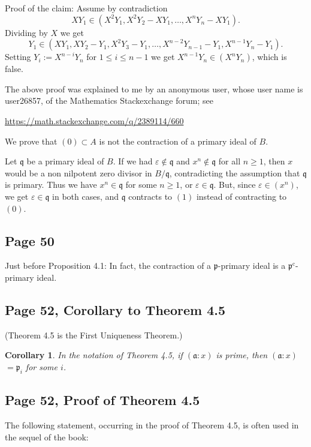\documentclass[parskip=half,fontsize=12pt]{scrartcl}%
\newcommand{\oo}{\operatorname}\newcommand{\ooo}{\operatorname*}
\newcommand{\mf}{\mathfrak}
\newcommand{\aaa}{\mf a}
\newcommand{\ppp}{\mf p}
\newtheorem{cor}[thm]{Corollary}
\begin{document}
Proof of the claim: Assume by contradiction 
$$
XY_1\in(X^2Y_1,X^2Y_2-XY_1,\dots,X^nY_n-XY_1).
$$ 
Dividing by $X$ we get 
$$
Y_1\in(XY_1,XY_2-Y_1,X^2Y_3-Y_1,\dots,X^{n-2}Y_{n-1}-Y_1,X^{n-1}Y_n-Y_1).
$$ 
Setting $Y_i:=X^{n-i}Y_n$ for $1\le i\le n-1$ we get $X^{n-1}Y_n\in(X^nY_n)$, which is false. 

The above proof was explained to me by an anonymous user, whose user name is user26857, of the Mathematics Stackexchange forum; see 

\href{https://math.stackexchange.com/q/2389114/660}{https://math.stackexchange.com/q/2389114/660}

We prove that $(0)\subset A$ is not the contraction of a primary ideal of $B$.

Let $\mathfrak q$ be a primary ideal of $B$. If we had $\varepsilon\notin\mathfrak q$ and $x^n\notin\mathfrak q$ for all $n\ge1$, then $x$ would be a non nilpotent zero divisor in $B/\mathfrak q$, contradicting the assumption that $\mathfrak q$ is primary. Thus we have $x^n\in\mathfrak q$ for some $n\ge1$, or $\varepsilon\in\mathfrak q$. But, since $\varepsilon\in(x^n)$, we get $\varepsilon\in\mathfrak q$ in both cases, and $\mathfrak q$ contracts to $(1)$ instead of contracting to $(0)$.

\subsection{Page 50}\label{contrpry}%

Just before Proposition 4.1: In fact, the contraction of a $\ppp$-primary ideal is a $\ppp^{\oo c}$-primary ideal.

\subsection{Page 52, Corollary to Theorem 4.5}%

(Theorem 4.5 is the First Uniqueness Theorem.)
\begin{cor}\label{c45}
In the notation of Theorem 4.5, if %
$(\aaa:x)$ is prime, then $(\aaa:x)$ $=\ppp_i$ for some $i$. %
\end{cor}

\subsection{Page 52, Proof of Theorem 4.5}%

The following statement, occurring in the proof of Theorem 4.5, is often used in the sequel of the book:
\end{document}
